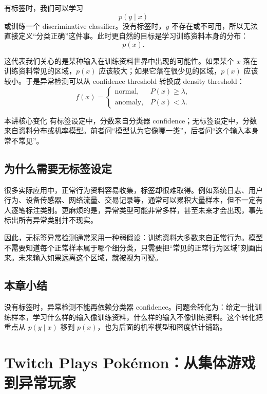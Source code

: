 \documentclass[a4paper]{article}
\begin{document}
有标签时，我们可以学习
\[
p(y\mid x)
\]
或训练一个 discriminative classifier。没有标签时，$y$ 不存在或不可用，所以无法直接定义“分类正确”这件事。此时更自然的目标是学习训练资料本身的分布：
\[
p(x).
\]

这代表我们关心的是某种输入在训练资料世界中出现的可能性。如果某个 $x$ 落在训练资料常见的区域，$p(x)$ 应该较大；如果它落在很少见的区域，$p(x)$ 应该较小。于是异常检测可以从 confidence threshold 转换成 density threshold：
\[
f(x)=
\begin{cases}
\mathrm{normal}, & P(x)\ge \lambda,\\
\mathrm{anomaly}, & P(x)< \lambda.
\end{cases}
\]

\begin{importantbox}{本讲核心变化}
    有标签设定中，分数来自分类器 confidence；无标签设定中，分数来自资料分布或机率模型。前者问“模型认为它像哪一类”，后者问“这个输入本身常不常见”。
\end{importantbox}

\subsection{为什么需要无标签设定}

很多实际应用中，正常行为资料容易收集，标签却很难取得。例如系统日志、用户行为、设备传感器、网络流量、交易记录等，通常可以累积大量样本，但不一定有人逐笔标注类别。更麻烦的是，异常类型可能非常多样，甚至未来才会出现，事先标出所有异常类别并不现实。

因此，无标签异常检测通常采用一种弱假设：训练资料大多数来自正常行为。模型不需要知道每个正常样本属于哪个细分类，只需要把“常见的正常行为区域”刻画出来。未来输入如果远离这个区域，就被视为可疑。

\subsection{本章小结}

没有标签时，异常检测不能再依赖分类器 confidence。问题会转化为：给定一批训练样本，学习什么样的输入像训练资料，什么样的输入不像训练资料。这个转化把重点从 $p(y\mid x)$ 移到 $p(x)$，也为后面的机率模型和密度估计铺路。

\section{Twitch Plays Pokémon：从集体游戏到异常玩家}
\end{document}
